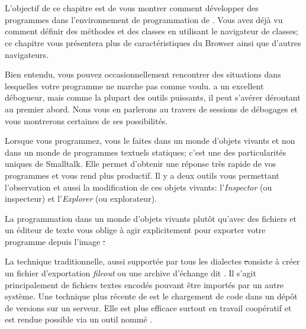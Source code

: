\documentclass[a4paper,10pt,twoside]{book}
\begin{document}
	\sloppy
\fi

\chapter{\titreEnvironment}



L'objectif de ce chapitre est de vous montrer comment développer des programmes 
dans l'environnement de programmation de \pharo.
Vous avez déjà vu comment définir des méthodes et des classes
en utilisant le navigateur de classes; ce chapitre
vous présentera plus de caractéristiques du Browser ainsi que
d'autres navigateurs. %

Bien entendu, vous pouvez occasionnellement rencontrer
des situations dans lesquelles votre programme ne marche pas comme voulu.
\pharo a un excellent débogueur, mais comme la plupart des outils puissants, il peut s'avérer déroutant au premier abord.
Nous vous en parlerons au travers de sessions de débogages et vous
montrerons certaines de ses possibilités.

Lorsque vous programmez, vous le faites dans un monde d'objets vivants et
non dans un monde de programmes textuels statiques; c'est 
une des particularités uniques de Smalltalk.
Elle permet d'obtenir une réponse très rapide de vos programmes et vous rend plus productif. 
Il y a deux outils vous permettant l'observation et aussi la modification de ces objets 
vivants: l'\emph{Inspector} (ou inspecteur) et l'\emph{Explorer} (ou explorateur).

La programmation dans un monde d'objets vivants plutôt qu'avec des fichiers et un éditeur 
de texte vous oblige à agir explicitement pour exporter votre programme depuis l'image \st.

La technique traditionnelle, aussi supportée par tous les dialectes \st consiste à créer un 
fichier d'exportation \emph{fileout} ou une archive d'échange dit \changeset. Il s'agit 
principalement de fichiers textes encodés pouvant être importés par un autre système.
Une technique plus récente de \pharo est le chargement de code dans un dépôt de versions sur un serveur.
Elle est plus efficace surtout en travail coopératif et est rendue possible via un outil nommé .
\end{document}

